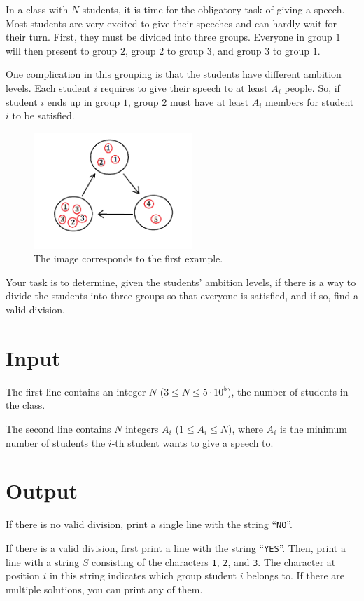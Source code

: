 \noindent
In a class with $N$ students, it is time for the obligatory task of giving a speech.
Most students are very excited to give their speeches and can hardly wait for their turn.
First, they must be divided into three groups. Everyone in group $1$ will then present to group $2$,
group $2$ to group $3$, and group $3$ to group $1$.

One complication in this grouping is that the students have different ambition levels. Each student $i$
requires to give their speech to at least $A_i$ people.
So, if student $i$ ends up in group $1$, group $2$ must have at least $A_i$ members for student $i$ to be satisfied.

\begin{figure}[!h]
  \centering
  \includegraphics[width=6cm]{triangeltal.png}
  \caption{The image corresponds to the first example.}
\end{figure}

Your task is to determine, given the students' ambition levels, if there is a way to divide the students into three groups so that everyone is satisfied, and if so, find a valid division.

\section*{Input}
The first line contains an integer $N$ ($3 \leq N \leq 5 \cdot 10^5$), the number of students in the class.

The second line contains $N$ integers $A_i$ ($1 \leq A_i \leq N$), where $A_i$ is the minimum number of students the $i$-th student wants to give a speech to.

\section*{Output}
If there is no valid division, print a single line with the string ``\texttt{NO}''.

If there is a valid division, first print a line with the string ``\texttt{YES}''.
Then, print a line with a string $S$ consisting of the characters \texttt{1}, \texttt{2}, and \texttt{3}.
The character at position $i$ in this string indicates which group student $i$ belongs to. If there are multiple solutions, you can print any of them.

